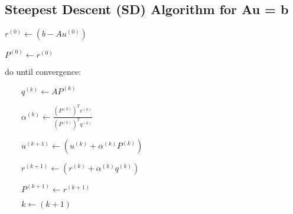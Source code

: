 \documentclass[11pt]{article}
\begin{document}
    \hypertarget{steepest-descent-sd-algorithm-for-au-b}{%
\subsection{Steepest Descent (SD) Algorithm for Au =
b}\label{steepest-descent-sd-algorithm-for-au-b}}

    \(r^{(0)} \leftarrow (b - Au^{(0)})\)

    \(P^{(0)} \leftarrow r^{(0)}\)

    do until convergence:

    \(\qquad q^{(k)} \leftarrow AP^{(k)}\)

    \(\qquad \alpha^{(k)} \leftarrow \frac{(P^{(k)})^Tr^{(k)}}{(P^{(k)})^Tq^{(k)}}\)

    \(\qquad u^{(k+1)} \leftarrow (u^{(k)} + \alpha^{(k)}P^{(k)})\)

    \(\qquad r^{(k+1)} \leftarrow (r^{(k)} + \alpha^{(k)}q^{(k)})\)

    \(\qquad P^{(k+1)} \leftarrow r^{(k+1)}\)

    \(\qquad k \leftarrow (k+1)\)
\end{document}

